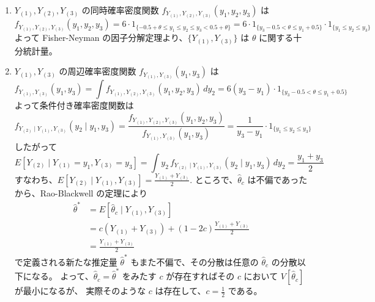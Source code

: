 \documentclass[./main.tex]{subfiles}
\begin{document}
\begin{enumerate}
        \item $Y_{(1)}, Y_{(2)}, Y_{(3)}$ の同時確率密度関数 $f_{Y_{(1)}, Y_{(2)}, Y_{(3)}} (y_1, y_2, y_3)$ は
        \begin{equation*}
            f_{Y_{(1)}, Y_{(2)}, Y_{(3)}} (y_1, y_2, y_3)
                = 6 \cdot 1_{ \{ - 0.5 + \theta \leq y_1 \leq y_2 \leq y_3 < 0.5 + \theta \}}
                = 6 \cdot 1_{ \{y_3 - 0.5 < \theta \leq y_1 + 0.5 \} } \cdot 1_{ \{ y_1 \leq y_2 \leq y_3 \}}
        \end{equation*}
        よって Fisher-Neyman の因子分解定理より、$\{ Y_{(1)}, Y_{(3)} \}$ は $\theta$ に関する十分統計量。

        \item $Y_{(1)}, Y_{(3)}$ の周辺確率密度関数 $f_{Y_{(1)}, Y_{(3)}} (y_1, y_3)$ は
        \begin{equation*}
            f_{Y_{(1)}, Y_{(3)}} (y_1, y_3)
                = \int f_{Y_{(1)}, Y_{(2)}, Y_{(3)}} (y_1, y_2, y_3) \, dy_2
                = 6(y_3 - y_1) \cdot 1_{ \{y_3 - 0.5 < \theta \leq y_1 + 0.5 \} } 
        \end{equation*}
        よって条件付き確率密度関数は
        \begin{equation*}
            f_{Y_{(2)} \mid Y_{(1)}, Y_{(3)}} ( y_2 \mid y_1, y_3)
                = \frac{f_{Y_{(1)}, Y_{(2)}, Y_{(3)}} (y_1, y_2, y_3)}{f_{Y_{(1)}, Y_{(3)}} (y_1, y_3)}
                = \frac{1}{y_3 - y_1} \cdot 1_{ \{ y_1 \leq y_2 \leq y_3 \}}
        \end{equation*}
        したがって
        \begin{equation*}
            E[ Y_{(2)} \mid Y_{(1)} = y_{1}, Y_{(3)} = y_{3}]
                = \int y_2 \, f_{Y_{(2)} \mid Y_{(1)}, Y_{(3)}} ( y_2 \mid y_1, y_3) \, dy_2
                = \frac{y_1 + y_3}{2}
        \end{equation*}
        すなわち、$\displaystyle E[ Y_{(2)} \mid Y_{(1)}, Y_{(3)}] = \frac{Y_{(1)} + Y_{(3)}}{2}$.
        ところで、$\hat{\theta}_c$ は不偏であったから、Rao-Blackwell の定理により
        \begin{align*}
            \hat{\theta}^*
                &= E [\hat{\theta}_c \mid Y_{(1)}, Y_{(3)}]\\
                &= c (Y_{(1)} + Y_{(3)}) + (1 - 2c) \frac{Y_{(1)} + Y_{(3)}}{2}\\
                &= \frac{Y_{(1)} + Y_{(3)}}{2}
        \end{align*}
        で定義される新たな推定量 $\hat{\theta}^*$ もまた不偏で、その分散は任意の $\hat{\theta}_c$ の分散以下になる。
        よって、$\hat{\theta}_c = \hat{\theta}^*$ をみたす $c$ が存在すればその $c$ において $V[\hat{\theta}_c]$ が最小になるが、
        実際そのような $c$ は存在して、$c = \frac{1}{2}$ である。
    \end{enumerate}
\end{document}
